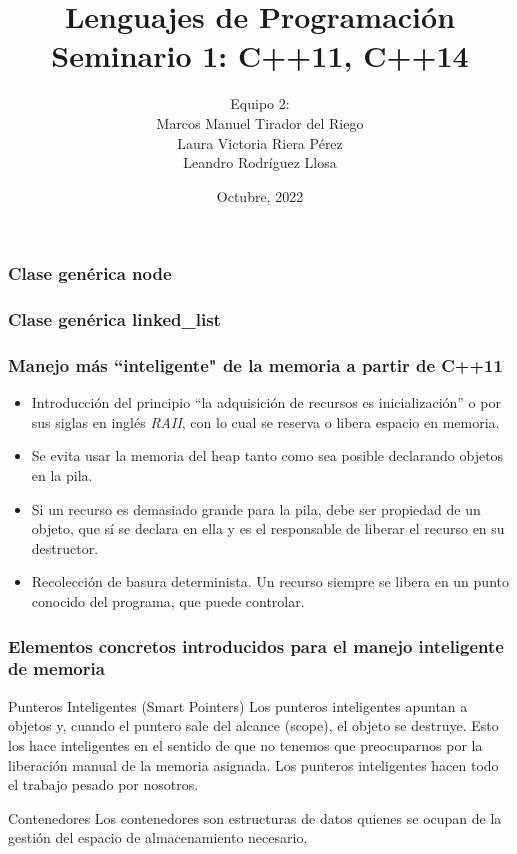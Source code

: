 \documentclass{beamer}
\title{Lenguajes de Programaci\'on\\
\textbf{Seminario 1: C++11, C++14}}
\author{Equipo 2:\\
	Marcos Manuel Tirador del Riego\\ 
	Laura Victoria Riera P\'erez\\
	Leandro Rodr\'iguez Llosa}
\institute{Ciencias de la computaci\'on}
\date{Octubre, 2022}
\begin{document}
	\frame{\titlepage}
	
	\begin{frame}
		\frametitle{Clase genérica node}
		
	\end{frame}
	
	\begin{frame}
		\frametitle{Clase genérica linked\_list }
		
	\end{frame}
	
	\begin{frame}
		\frametitle{Manejo más ``inteligente" de la memoria a partir de C++11}
		
		\begin{itemize}
			\item Introducci\'on del principio ``la adquisición de recursos es inicialización'' o por sus siglas en ingl\'es \textit{RAII}, con lo cual se reserva o libera espacio en memoria. 
			
			\item Se evita usar la memoria del heap tanto como sea posible declarando objetos en la pila. 
			
			\item Si un recurso es demasiado grande para la pila, debe ser propiedad de un objeto, que s\'i se declara en ella y es el responsable de liberar el recurso en su destructor. 
			
			\item Recolecci\'on de basura determinista. Un recurso siempre se libera en un punto conocido del programa, que puede controlar.
		\end{itemize}
	\end{frame}
	
	\begin{frame}
		\frametitle{Elementos concretos introducidos para el manejo inteligente de memoria}
		
		\begin{block}{Punteros Inteligentes (Smart Pointers)}
	 		Los punteros inteligentes apuntan a objetos y, cuando el puntero sale del alcance (scope), el objeto se destruye. Esto los hace inteligentes en el sentido de que no tenemos que preocuparnos por la liberaci\'on manual de la memoria asignada. Los punteros inteligentes hacen todo el trabajo pesado por nosotros.
		\end{block}
		
		\begin{block}{Contenedores}
			Los contenedores son estructuras de datos quienes se ocupan de la gestión del espacio de almacenamiento necesario.
		\end{block}
	
	\end{frame}
	
\end{document}
